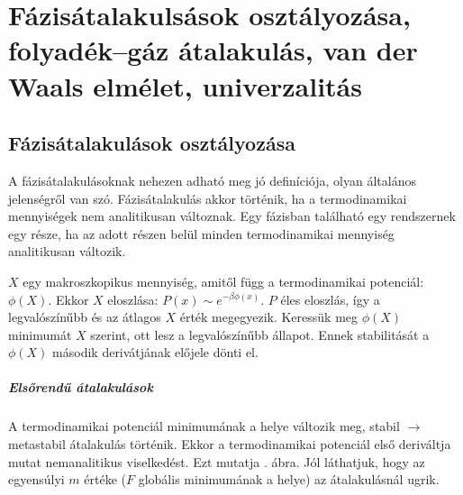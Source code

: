 \chapter{F\'azis\'atalakuls\'asok oszt\'alyoz\'asa, folyad\'ek--g\'az \'atalakul\'as, van der Waals elm\'elet, univerzalit\'as} 
 
 \section{Fázisátalakulások osztályozása}
  
  A fázisátalakulásoknak nehezen adható meg jó definíciója, olyan általános jelenségről van szó. Fázisátalakulás akkor történik, ha a termodinamikai mennyiségek nem analitikusan változnak. Egy fázisban található egy rendszernek egy része, ha az adott részen belül minden termodinamikai mennyiség analitikusan változik.
  
  $X$ egy makroszkopikus mennyiség, amitől függ a termodinamikai potenciál: $\phi(X)$. Ekkor $X$ eloszlása: $P(x)\sim e^{-\beta\phi(x)}$. $P$ éles eloszlás, így a legvalószínűbb és az átlagos $X$ érték megegyezik. Keressük meg $\phi(X)$ minimumát $X$ szerint, ott lesz a legvalószínűbb állapot. Ennek stabilitását a $\phi(X)$ második derivátjának előjele dönti el. 
  
  \paragraph{Elsőrendű átalakulások}
  
   A termodinamikai potenciál minimumának a helye változik meg, stabil $\rightarrow$ metastabil átalakulás történik. Ekkor a termodinamikai potenciál első deriváltja mutat nemanalitikus viselkedést. Ezt mutatja . ábra. Jól láthatjuk, hogy az egyensúlyi $m$ értéke ($F$ globális minimumának a helye) az átalakulásnál ugrik. 
   
